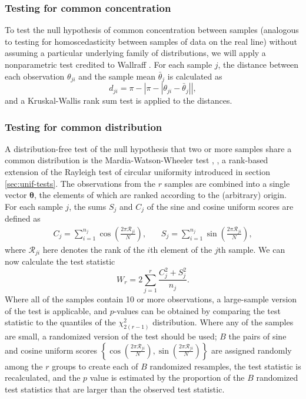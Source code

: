 \documentclass[../../ArchStats.tex]{subfiles}
\begin{document}
\subsubsection{Testing for common concentration}
\label{sec:common-concentration}

To test the null hypothesis of common concentration between samples (analogous to testing for homoscedasticity between samples of data on the real line) without assuming a particular underlying family of distributions, we will apply a nonparametric test credited to Wallraff \cite{Wallraff1979}. For each sample $j$, the distance between each observation $\theta_{ji}$ and the sample mean $\bar{\theta}_j$ is calculated as
	\begin{equation}
	d_{ji} = \pi - \left\vert \pi - \left\vert \theta_{ji} - 	\bar{\theta}_j \right\vert \right\vert,
	\end{equation}
and a Kruskal-Wallis rank sum test is applied to the distances.

\subsubsection{Testing for common distribution}

A distribution-free test of the null hypothesis that two or more samples share a common distribution is the Mardia-Watson-Wheeler test \cite{Wheeler1962}, \cite{Mardia1972}, a rank-based extension of the Rayleigh test of circular uniformity introduced in section \ref{sec:unif-tests}. The observations from the $r$ samples are combined into a single vector $\boldsymbol{\theta}$, the elements of which are ranked according to the (arbitrary) origin. For each sample $j$, the sums $S_j$ and $C_j$ of the sine and cosine uniform scores are defined as
	\begin{equation}
	\begin{matrix*}
	C_j = \sum_{i=1}^{n_j} \cos \left( \frac{2\pi \mathcal{R}_{ji}}{N} \right),  & \,  &
	S_j = \sum_{i=1}^{n_j} \sin \left( \frac{2\pi \mathcal{R}_{ji}}{N} \right),
	\end{matrix*} 
	\end{equation}
where $\mathcal{R}_{ji}$ here denotes the rank of the $i$th element of the $j$th sample. We can now calculate the test statistic
	\begin{equation}
	W_r = 2 \sum_{j=1}^r \frac{C_j^2 + S_j^2}{n_j}.
 	\end{equation}
Where all of the samples contain 10 or more observations, a large-sample version of the test is applicable, and $p$-values can be obtained by comparing the test statistic to the quantiles of the $\chi^2_{2(r-1)}$ distribution. Where any of the samples are small, a randomized version of the test should be used; $B$ the pairs of sine and cosine uniform scores $\left\lbrace \cos \left( \frac{2\pi \mathcal{R}_{ji}}{N}\right), \sin \left( \frac{2\pi \mathcal{R}_{ji}}{N}\right) \right\rbrace$ are assigned randomly among the $r$ groups to create each of $B$ randomized resamples, the test statistic is recalculated, and the $p$ value is estimated by the proportion of the $B$ randomized test statistics that are larger than the observed test statistic.
\end{document}
